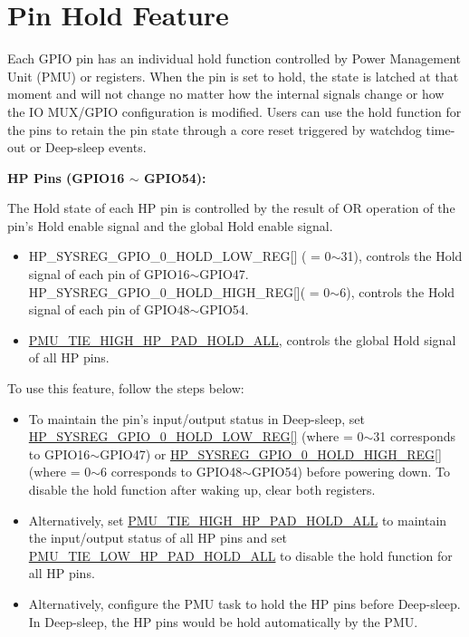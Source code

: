 \documentclass[main\_\_EN.tex]{subfiles}
\begin{document}
{\section{Pin Hold Feature}\label{PadHold}

Each GPIO pin has an individual hold function controlled by Power Management Unit (PMU) or registers. When the pin is set to hold, the state is latched at that moment and will not change no matter how the internal signals change or how the IO MUX/GPIO configuration is modified. Users can use the hold function for the pins to retain the pin state through a core reset triggered by watchdog time-out or Deep-sleep events.

\textbf{HP Pins (GPIO16 $\sim$ GPIO54):}

The Hold state of each HP pin is controlled by the result of OR operation of the pin's Hold enable signal and the global Hold enable signal.

\begin{itemize}
    \item HP\_SYSREG\_GPIO\_0\_HOLD\_LOW\_REG[] ( = 0$\sim$31), controls the Hold signal of each pin of GPIO16$\sim$GPIO47. HP\_SYSREG\_GPIO\_0\_HOLD\_HIGH\_REG[]( = 0$\sim$6), controls the Hold signal of each pin of GPIO48$\sim$GPIO54.
    \item \hyperref[fielddesc:PMUTIEHIGHHPPADHOLDALL]{PMU\_TIE\_HIGH\_HP\_PAD\_HOLD\_ALL}, controls the global Hold signal of all HP pins.
\end{itemize}

To use this feature, follow the steps below:

    \begin{itemize}
        \item To maintain the pin's input/output status in Deep-sleep, set \hyperref[regdesc:HPSYS0HOLDLOWREG]{HP\_SYSREG\_GPIO\_0\_HOLD\_LOW\_REG[]} (where  = 0$\sim$31 corresponds to GPIO16$\sim$GPIO47) or \hyperref[regdesc:HPSYS0HOLDHIGHREG]{HP\_SYSREG\_GPIO\_0\_HOLD\_HIGH\_REG[]} (where  = 0$\sim$6 corresponds to GPIO48$\sim$GPIO54) before powering down. To disable the hold function after waking up, clear both registers.
        \item Alternatively, set \hyperref[fielddesc:PMUTIEHIGHHPPADHOLDALL]{PMU\_TIE\_HIGH\_HP\_PAD\_HOLD\_ALL} to maintain the input/output status of all HP pins and set \hyperref[fielddesc:PMUTIELOWHPPADHOLDALL]{PMU\_TIE\_LOW\_HP\_PAD\_HOLD\_ALL} to disable the hold function for all HP pins.
        \item Alternatively, configure the PMU task to hold the HP pins before Deep-sleep. In Deep-sleep, the HP pins would be hold automatically by the PMU.
    \end{itemize}

}
\end{document}
